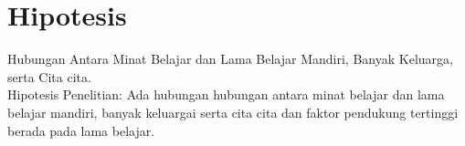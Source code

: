 \section{Hipotesis}

Hubungan Antara Minat Belajar dan Lama Belajar Mandiri, Banyak Keluarga, serta Cita cita. \\

Hipotesis Penelitian:
Ada hubungan hubungan antara minat belajar dan lama belajar mandiri, banyak keluargai serta cita cita dan faktor pendukung tertinggi berada pada lama belajar.
